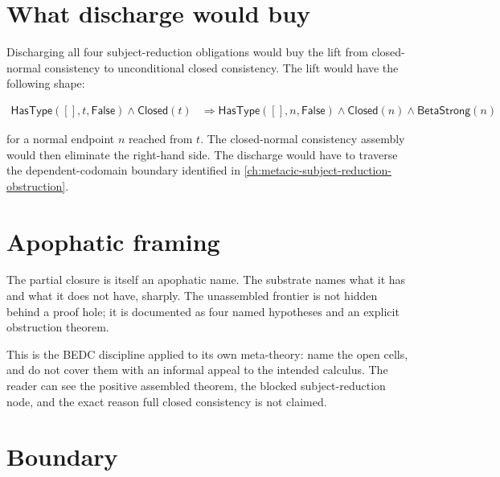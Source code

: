 \section{What discharge would buy}
\label{sec:closed-metacic-consistency-assembly-discharge-value}

Discharging all four subject-reduction obligations would buy the lift from
closed-normal consistency to unconditional closed consistency. The lift would
have the following shape:

$$
\begin{aligned}
  \mathsf{HasType}([],t,\mathsf{False})
  \wedge
  \mathsf{Closed}(t)
  &\Rightarrow
  \mathsf{HasType}([],n,\mathsf{False})
  \wedge
  \mathsf{Closed}(n)
  \wedge
  \mathsf{BetaStrong}(n)
\end{aligned}
$$

for a normal endpoint $n$ reached from $t$. The closed-normal consistency
assembly would then eliminate the right-hand side. The discharge would have to
traverse the dependent-codomain boundary identified in
\autoref{ch:metacic-subject-reduction-obstruction}.

\section{Apophatic framing}
\label{sec:closed-metacic-consistency-assembly-apophatic-framing}

The partial closure is itself an apophatic name. The substrate names what it has
and what it does not have, sharply. The unassembled frontier is not hidden
behind a proof hole; it is documented as four named hypotheses and an explicit
obstruction theorem.

This is the BEDC discipline applied to its own meta-theory: name the open cells,
and do not cover them with an informal appeal to the intended calculus. The
reader can see the positive assembled theorem, the blocked subject-reduction
node, and the exact reason full closed consistency is not claimed.


\section{Boundary}
\label{sec:closed-metacic-consistency-assembly-boundary}

